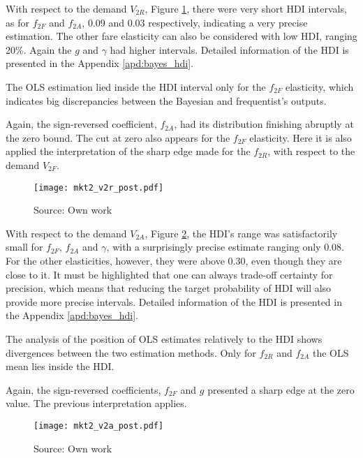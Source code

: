 With respect to the demand $V_{2R}$, Figure \ref{fig:mkt2_v2r_post}, there were very short HDI intervals, as for $f_{2F}$ and $f_{2A}$, 0.09 and 0.03 respectively, indicating a very precise estimation. The other fare elasticity can also be considered with low HDI, ranging 20\%. Again the $g$ and $\gamma$ had higher intervals. Detailed information of the HDI is presented in the Appendix \ref{apd:bayes_hdi}. 

The OLS estimation lied inside the HDI interval only for the $f_{2F}$ elasticity, which indicates big discrepancies between the Bayesian and frequentist's outputs.

Again, the sign-reversed coefficient, $f_{2A}$, had its distribution finishing abruptly at the zero bound. The cut at zero also appears for the $f_{2F}$ elasticity. Here it is also applied the interpretation of the sharp edge made for the $f_{2R}$, with respect to the demand $V_{2F}$.

\begin{figure}[H]
\centering
\texttt{[image: mkt2\_v2r\_post.pdf]}
\caption{Posterior density function of elasticities w.r.t $V_{2R}$ - Market 2}
\label{fig:mkt2_v2r_post}
\caption*{Source: Own work}
\end{figure} 

With respect to the demand $V_{2A}$, Figure \ref{fig:mkt2_v2a_post}, the HDI's range was satisfactorily small for $f_{2F}$, $f_{2A}$ and $\gamma$, with a surprisingly precise estimate ranging only 0.08. For the other elasticities, however, they were above 0.30, even though they are close to it. It must be highlighted that one can always trade-off certainty for precision, which means that reducing the target probability of HDI will also provide more precise intervals. Detailed information of the HDI is presented in the Appendix \ref{apd:bayes_hdi}. 

The analysis of the position of OLS estimates relatively to the HDI shows divergences between the two estimation methods. Only for $f_{2R}$ and $f_{2A}$ the OLS mean lies inside the HDI.

Again, the sign-reversed coefficients, $f_{2F}$ and $g$ presented a sharp edge at the zero value. The previous interpretation applies.

\begin{figure}[H]
\centering
\texttt{[image: mkt2\_v2a\_post.pdf]}
\caption{Posterior density function of elasticities w.r.t $V_{2A}$ - Market 2}
\label{fig:mkt2_v2a_post}
\caption*{Source: Own work}
\end{figure} 

